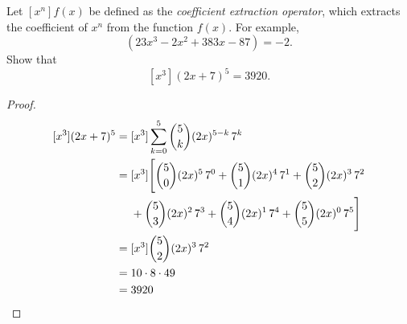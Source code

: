 \documentclass[letterpaper]{article}
\begin{document}

  Let $[x^n]f(x)$ be defined as the \emph{coefficient extraction operator}, which extracts the coefficient of $x^n$ from the function $f(x)$. For example,
    \begin{equation*}
      [x^2](23x^3-2x^2+383x-87) = -2.
    \end{equation*}
  Show that
    \[ [x^3](2x+7)^5 = 3920. \]

  \begin{proof}
    \begin{align*}
      [x^3](2x+7)^5 = {} & [x^3] \sum_{k=0}^{5} \binom{5}{k} (2x)^{5-k}\, 7^k \\
                    = {} & [x^3] \Bigg[ \binom{5}{0} (2x)^5\, 7^0+ \binom{5}{1} (2x)^4\, 7^1 + \binom{5}{2} (2x)^3\, 7^2 \\
                         & + \binom{5}{3} (2x)^2\, 7^3 + \binom{5}{4} (2x)^1\, 7^4 + \binom{5}{5} (2x)^0\, 7^5  \Bigg] \\
                    = {} & [x^3] \binom{5}{2} (2x)^3\, 7^2 \\
                    = {} & 10 \cdot 8 \cdot 49 \\
                    = {} & 3920 \qedhere
    \end{align*}
  \end{proof}
\end{document}
